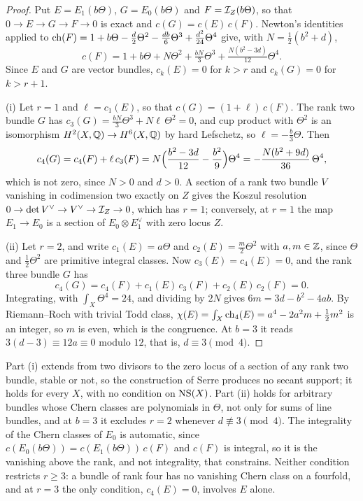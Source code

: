 \begin{proof}
Put $E=E_{1}(b\Theta)$, $G=E_{0}(b\Theta)$ and $F=\mathcal{I}_{Z}(b\Theta)$, so that
$0\to E\to G\to F\to0$ is exact and $c(G)=c(E)\,c(F)$. Newton's identities
applied to $\operatorname{ch}(F)=1+b\Theta-\frac d2\Theta^{2}-\frac{db}{6}\Theta^{3}
+\frac{d^{2}}{24}\Theta^{4}$ give, with $N=\frac12(b^{2}+d)$,
\[
  c(F)=1+b\Theta+N\Theta^{2}+\tfrac{bN}{3}\Theta^{3}
  +\tfrac{N(b^{2}-3d)}{12}\Theta^{4}.
\]
Since $E$ and $G$ are vector bundles, $c_{k}(E)=0$ for $k>r$ and
$c_{k}(G)=0$ for $k>r+1$.

(i) Let $r=1$ and $\ell=c_{1}(E)$, so that $c(G)=(1+\ell)\,c(F)$. The rank
two bundle $G$ has $c_{3}(G)=\frac{bN}{3}\Theta^{3}+N\ell\,\Theta^{2}=0$, and
cup product with $\Theta^{2}$ is an isomorphism $H^{2}(X,\mathbb{Q})\to H^{6}(X,\mathbb{Q})$
by hard Lefschetz, so $\ell=-\frac b3\Theta$. Then
\[
  c_{4}(G)=c_{4}(F)+\ell\,c_{3}(F)
  =N\Bigl(\frac{b^{2}-3d}{12}-\frac{b^{2}}{9}\Bigr)\Theta^{4}
  =-\frac{N(b^{2}+9d)}{36}\,\Theta^{4},
\]
which is not zero, since $N>0$ and $d>0$. A section of a rank two bundle $V$
vanishing in codimension two exactly on $Z$ gives the Koszul resolution
$0\to\det V^{\vee}\to V^{\vee}\to\mathcal{I}_{Z}\to0$, which has $r=1$; conversely,
at $r=1$ the map $E_{1}\to E_{0}$ is a section of $E_{0}\otimes E_{1}^{\vee}$
with zero locus $Z$.

(ii) Let $r=2$, and write $c_{1}(E)=a\Theta$ and $c_{2}(E)=\frac m2\Theta^{2}$
with $a,m\in\mathbb{Z}$, since $\Theta$ and $\frac12\Theta^{2}$ are primitive
integral classes. Now $c_{3}(E)=c_{4}(E)=0$, and the rank three bundle $G$
has
\[
  c_{4}(G)=c_{4}(F)+c_{1}(E)\,c_{3}(F)+c_{2}(E)\,c_{2}(F)=0 .
\]
Integrating, with $\int_{X}\Theta^{4}=24$, and dividing by $2N$ gives
$6m=3d-b^{2}-4ab$. By Riemann--Roch with trivial Todd class,
$\chi(E)=\int_{X}\operatorname{ch}_{4}(E)=a^{4}-2a^{2}m+\frac12m^{2}$ is an integer, so $m$
is even, which is the congruence. At $b=3$ it reads $3(d-3)\equiv12a\equiv0$
modulo $12$, that is, $d\equiv3\pmod4$.
\end{proof}

\begin{remark}\label{rem:lowrankburch}
Part (i) extends  from two divisors to the zero locus of a
section of any rank two bundle, stable or not, so the construction of Serre
produces no secant support; it holds for every $X$, with no condition on
$\mathrm{NS}(X)$. Part (ii) holds for arbitrary bundles whose Chern classes are
polynomials in $\Theta$, not only for sums of line bundles, and at $b=3$ it
excludes $r=2$ whenever $d\not\equiv3\pmod4$. The integrality of
the Chern classes of $E_{0}$ is automatic, since
$c(E_{0}(b\Theta))=c(E_{1}(b\Theta))\,c(F)$ and $c(F)$ is integral, so it is
the vanishing above the rank, and not integrality, that constrains. Neither
condition restricts $r\ge3$: a bundle of rank four has no vanishing Chern
class on a fourfold, and at $r=3$ the only condition, $c_{4}(E)=0$, involves
$E$ alone.
\end{remark}

